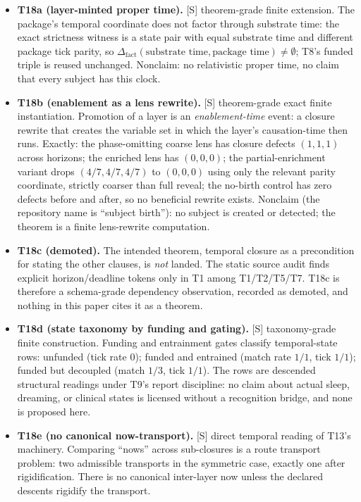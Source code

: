 \documentclass[11pt]{article}
\newcommand{\gradeS}{\textsf{[S]}}
\newcommand{\Dfact}{\Delta_{\mathrm{fact}}}
\theoremstyle{definition}
\begin{document}
\begin{itemize}
\item \textbf{T18a (layer-minted proper time).} \gradeS{} theorem-grade finite
extension. The package's temporal coordinate does not factor through
substrate time: the exact strictness witness is a state pair with equal
substrate time and different package tick parity, so
$\Dfact(\text{substrate time}, \text{package time}) \neq \emptyset$; T8's
funded triple is reused unchanged. Nonclaim: no relativistic proper time, no
claim that every subject has this clock.
\item \textbf{T18b (enablement as a lens rewrite).} \gradeS{} theorem-grade
exact finite instantiation. Promotion of a layer is an \emph{enablement-time}
event: a closure rewrite that creates the variable set in which the layer's
causation-time then runs. Exactly: the phase-omitting coarse lens has closure
defects $(1,1,1)$ across horizons; the enriched lens has $(0,0,0)$; the
partial-enrichment variant drops $(4/7,4/7,4/7)$ to $(0,0,0)$ using only the
relevant parity coordinate, strictly coarser than full reveal; the no-birth
control has zero defects before and after, so no beneficial rewrite exists.
Nonclaim (the repository name is ``subject birth''): no subject is created or
detected; the theorem is a finite lens-rewrite computation.
\item \textbf{T18c (demoted).} The intended theorem, temporal closure as a
precondition for stating the other clauses, is \emph{not} landed. The
static source audit finds explicit horizon/deadline tokens only in T1 among
T1/T2/T5/T7. T18c is therefore a schema-grade dependency observation,
recorded as demoted, and nothing in this paper cites it as a theorem.
\item \textbf{T18d (state taxonomy by funding and gating).} \gradeS{}
taxonomy-grade finite construction. Funding and entrainment gates classify
temporal-state rows: unfunded (tick rate $0$); funded and entrained (match
rate $1/1$, tick $1/1$); funded but decoupled (match $1/3$, tick $1/1$). The
rows are descended structural readings under T9's report discipline:
no claim about actual sleep, dreaming, or clinical states is licensed without
a recognition bridge, and none is proposed here.
\item \textbf{T18e (no canonical now-transport).} \gradeS{} direct temporal
reading of T13's machinery. Comparing ``nows'' across sub-closures is a route
transport problem: two admissible transports in the symmetric case, exactly
one after rigidification. There is no canonical inter-layer now unless the
declared descents rigidify the transport.
\end{itemize}
\end{document}
